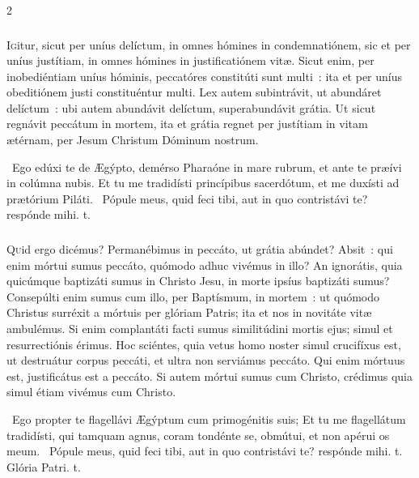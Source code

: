 \documentclass[9pt,twoside]{extarticle}
\begin{document}
\begin{multicols}{2}
\subsubsection*{\center{}}
\lettrine{I}gitur, sicut per uníus delíctum, in omnes hómines in condemnatiónem, sic et per uníus justítiam, in omnes hómines in justificatiónem vitæ. Sicut enim, per inobediéntiam uníus hóminis, peccatóres constitúti sunt multi~: ita et per uníus obeditiónem justi constituéntur multi. Lex autem subintrávit, ut abundáret delíctum~: ubi autem abundávit delíctum, superabundávit grátia. Ut sicut regnávit peccátum in mortem, ita et grátia regnet per justítiam in vitam ætérnam, per Jesum Christum Dóminum nostrum.

\begin{tightlist}{}
\item {}~Ego edúxi te de Ægýpto, demérso Pharaóne in mare rubrum, et ante te præívi in colúmna nubis. \textred{*} Et tu me tradidísti princípibus sacerdótum, et me duxísti ad prætórium Piláti. ~Pópule meus, quid feci tibi, aut in quo contristávi te? respónde mihi. t.
\end{tightlist}

\subsubsection*{\center{}}
\lettrine{Q}uid ergo dicémus? Permanébimus in peccáto, ut grátia abúndet? Absit~: qui enim mórtui sumus peccáto, quómodo adhuc vivémus in illo? An ignorátis, quia quicúmque baptizáti sumus in Christo Jesu, in morte ipsíus baptizáti sumus? Consepúlti enim sumus cum illo, per Baptísmum, in mortem~: ut quómodo Christus surréxit a mórtuis per glóriam Patris; ita et nos in novitáte vitæ ambulémus. Si enim complantáti facti sumus similitúdini mortis ejus; simul et resurrectiónis érimus. Hoc sciéntes, quia vetus homo noster simul crucifíxus est, ut destruátur corpus peccáti, et ultra non serviámus peccáto. Qui enim mórtuus est, justificátus est a peccáto. Si autem mórtui sumus cum Christo, crédimus quia simul étiam vivémus cum Christo.

\begin{tightlist}{}
\item {}~Ego propter te flagellávi Ægýptum cum primogénitis suis; \textred{*} Et tu me flagellátum tradidísti, qui tamquam agnus, coram tondénte se, obmútui, et non apérui os meum. ~Pópule meus, quid feci tibi, aut in quo contristávi te? respónde mihi. t. Glória Patri. t.
\end{tightlist}


\end{multicols}
\end{document}
